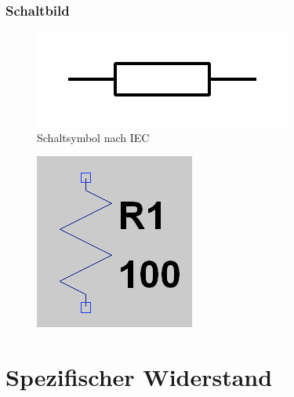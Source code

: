 \begin{frame}
  \frametitle{Schaltbild}

  \begin{center}
    \begin{figure}
      \includegraphics[width=.3\textwidth,height=.3\textheight,keepaspectratio]{e04/Resistor_symbol_IEC.png}
      \caption{Schaltsymbol nach IEC \cite{wdst_iec}}
      \label{fig_wdst_iec}
    \end{figure}
  \end{center}

  \begin{center}
    \begin{figure}
      \includegraphics[width=.4\textwidth,height=.4\textheight,keepaspectratio]{e04/R_LTspice.png}
    \end{figure}
  \end{center}

\end{frame}


\section*{Spezifischer Widerstand}

